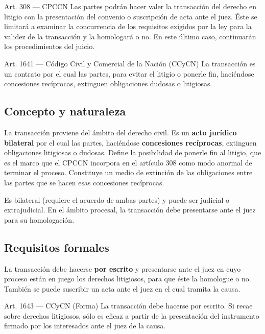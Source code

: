 \documentclass[12pt,oneside]{book}
\begin{document}
\begin{articulo}{Art. 308 --- CPCCN}
Las partes podrán hacer valer la transacción del derecho en litigio con la presentación del convenio o suscripción de acta ante el juez. Éste se limitará a examinar la concurrencia de los requisitos exigidos por la ley para la validez de la transacción y la homologará o no. En este último caso, continuarán los procedimientos del juicio.
\end{articulo}

\begin{articulo}{Art. 1641 --- Código Civil y Comercial de la Nación (CCyCN)}
La transacción es un contrato por el cual las partes, para evitar el litigio o ponerle fin, haciéndose concesiones recíprocas, extinguen obligaciones dudosas o litigiosas.
\end{articulo}

\subsection{Concepto y naturaleza}

La transacción proviene del ámbito del derecho civil. Es un \textbf{acto jurídico bilateral} por el cual las partes, haciéndose \textbf{concesiones recíprocas}, extinguen obligaciones litigiosas o dudosas. Define la posibilidad de ponerle fin al litigio, que es el marco que el CPCCN incorpora en el artículo 308 como modo anormal de terminar el proceso. Constituye un medio de extinción de las obligaciones entre las partes que se hacen esas concesiones recíprocas.

Es bilateral (requiere el acuerdo de ambas partes) y puede ser judicial o extrajudicial. En el ámbito procesal, la transacción debe presentarse ante el juez para su homologación.

\subsection{Requisitos formales}

La transacción debe hacerse \textbf{por escrito} y presentarse ante el juez en cuyo proceso están en juego los derechos litigiosos, para que éste la homologue o no. También se puede suscribir un acta ante el juez en el cual tramita la causa.

\begin{articulo}{Art. 1643 --- CCyCN (Forma)}
La transacción debe hacerse por escrito. Si recae sobre derechos litigiosos, sólo es eficaz a partir de la presentación del instrumento firmado por los interesados ante el juez de la causa.
\end{articulo}
\end{document}

